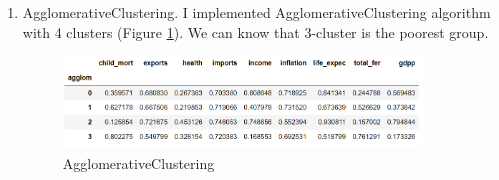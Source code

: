 \documentclass[12pt]{article}
\begin{document}
\begin{itemize}
\begin{enumerate}
      1                  Tajikistan\\
      1                       Benin\\
      1                     Comoros\\
      1                        Chad\\
      1                       Kenya\\
      1                     Myanmar\\
      1                     Senegal\\
      1                    Pakistan\\
      1                     Lesotho\\
      1                  Mauritania\\
      1               Cote d'Ivoire\\
      1                       Ghana\\
      1                    Cameroon\\
      1                       Yemen\\
      1                      Zambia\\
      1                       Sudan\\
      1                    Kiribati\\
      1                     Nigeria\\
      1                      Angola\\
      1                 Timor-Leste\\

      \item AgglomerativeClustering. I implemented AgglomerativeClustering algorithm with 4 clusters (Figure \ref{agglom}). We can know that 3-cluster is the poorest group.
      \begin{figure}[H]
        \centering
        \includegraphics[width=0.9\textwidth]{figures/agglom.png}
        \caption{AgglomerativeClustering}\label{agglom}
      \end{figure}


\end{enumerate}
\end{itemize}
\end{document}
